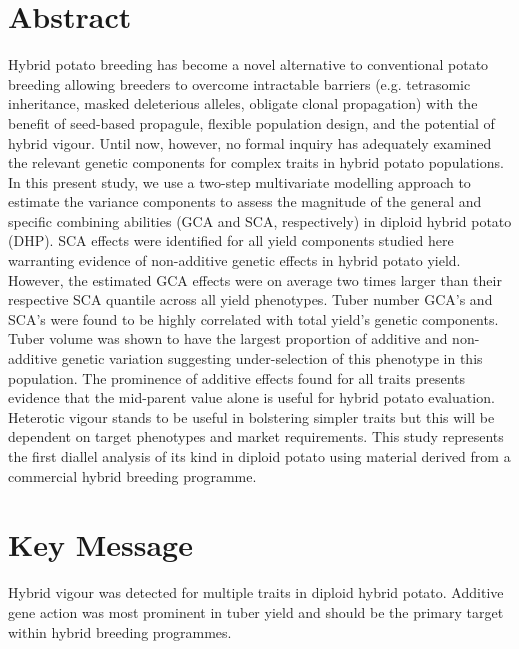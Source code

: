 \begin{refsection}
\section*{Abstract}
 Hybrid potato breeding has become a novel alternative to conventional potato breeding allowing breeders to overcome intractable barriers (e.g. tetrasomic inheritance, masked deleterious alleles, obligate clonal propagation) with the benefit of seed-based propagule, flexible population design, and the potential of hybrid vigour. Until now, however, no formal inquiry has adequately examined the relevant genetic components for complex traits in hybrid potato populations. In this present study, we use a two-step multivariate modelling approach to estimate the variance components to assess the magnitude of the general and specific combining abilities (GCA and SCA, respectively) in diploid hybrid potato (DHP). SCA effects were identified for all yield components studied here warranting evidence of non-additive genetic effects in hybrid potato yield. However, the estimated GCA effects were on average two times larger than their respective SCA quantile across all yield phenotypes. Tuber number GCA’s and SCA’s were found to be highly correlated with total yield's genetic components. Tuber volume was shown to have the largest proportion of additive and non-additive genetic variation suggesting under-selection of this phenotype in this population. The prominence of additive effects found for all traits presents evidence that the mid-parent value alone is useful for hybrid potato evaluation. Heterotic vigour stands to be useful in bolstering simpler traits but this will be dependent on target phenotypes and market requirements. This study represents the first diallel analysis of its kind in diploid potato using material derived from a commercial hybrid breeding programme.

\section{Key Message}\label{key-message}

Hybrid vigour was detected for multiple traits in diploid hybrid potato. Additive gene action was most prominent in tuber yield and should be the primary target within hybrid breeding programmes.

\newpage

%
%
%
%
%
%
%
%


\end{refsection}
